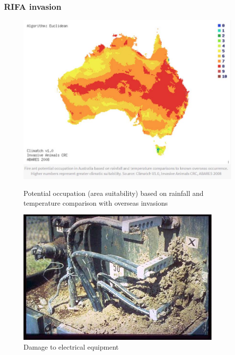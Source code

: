 \documentclass[9pt]{beamer}
\begin{document}
\begin{frame}
\frametitle{RIFA invasion}
\begin{figure}
\begin{minipage}{0.4\textwidth}
\centering
\includegraphics[scale=0.2]{map.JPG}
\caption{Potential occupation (area suitability) based on rainfall and temperature comparison with overseas invasions}
\end{minipage}
\begin{minipage}{0.4\textwidth}
\centering
\includegraphics[scale=0.2]{RIFA_electrical.jpg}
\caption{Damage to electrical equipment}
\end{minipage}%
\begin{minipage}{0.4\textwidth}
\centering

\end{minipage}
\end{figure}
\end{frame}
\end{document}
